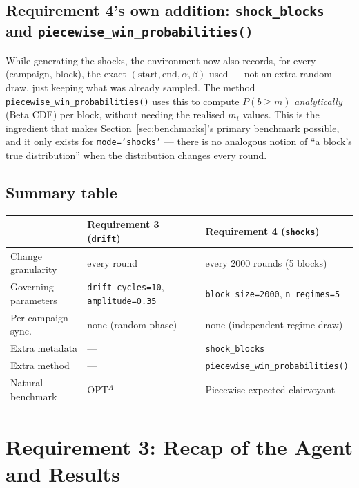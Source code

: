 \documentclass[11pt,a4paper]{article}
\newcommand{\1}{\mathbf{1}}
\begin{document}
\subsection{Requirement 4's own addition: \texttt{shock\_blocks} and \texttt{piecewise\_win\_probabilities()}}

While generating the shocks, the environment now also records, for every (campaign, block), the exact $(\text{start}, \text{end}, \alpha, \beta)$ used --- not an extra random draw, just keeping what was already sampled. The method \texttt{piecewise\_win\_probabilities()} uses this to compute $P(b \ge m)$ \emph{analytically} (Beta CDF) per block, without needing the realised $m_t$ values. This is the ingredient that makes Section~\ref{sec:benchmarks}'s primary benchmark possible, and it only exists for \texttt{mode='shocks'} --- there is no analogous notion of ``a block's true distribution'' when the distribution changes every round.

\subsection{Summary table}

\begin{center}
\begin{tabular}{@{}lll@{}}
\toprule
 & Requirement 3 (\texttt{drift}) & Requirement 4 (\texttt{shocks}) \\
\midrule
Change granularity & every round & every 2000 rounds (5 blocks) \\
Governing parameters & \texttt{drift\_cycles=10}, \texttt{amplitude=0.35} & \texttt{block\_size=2000}, \texttt{n\_regimes=5} \\
Per-campaign sync. & none (random phase) & none (independent regime draw) \\
Extra metadata & --- & \texttt{shock\_blocks} \\
Extra method & --- & \texttt{piecewise\_win\_probabilities()} \\
Natural benchmark & OPT$^A$ & Piecewise-expected clairvoyant \\
\bottomrule
\end{tabular}
\end{center}

\section{Requirement 3: Recap of the Agent and Results}
\end{document}
